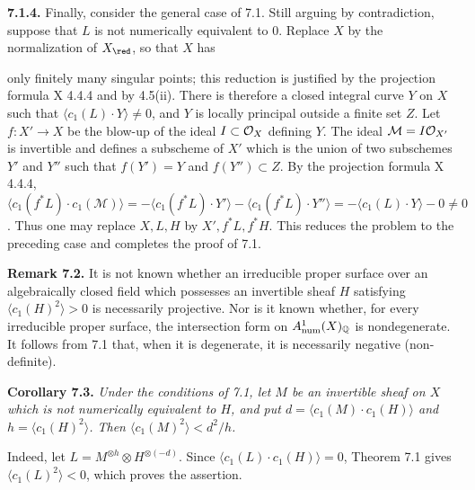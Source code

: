 \textbf{7.1.4.} Finally, consider the general case of 7.1. Still arguing by contradiction, suppose that $L$ is not numerically equivalent to $0$. Replace $X$ by the normalization of $X_{\red}$, so that $X$ has

only finitely many singular points; this reduction is justified by the projection formula X 4.4.4 and by 4.5(ii). There is therefore a closed integral curve $Y$ on $X$ such that
$\langle c_1(L)\cdot Y\rangle\ne0$, and $Y$ is locally principal
outside a finite set $Z$. Let $f:X'\to X$ be the blow-up of the ideal
$I\subset\mathcal O_X$ defining $Y$. The ideal $\mathcal M=I\mathcal O_{X'}$ is
invertible and defines a subscheme of $X'$ which is the union of two
subschemes $Y'$ and $Y''$ such that $f(Y')=Y$ and $f(Y'')\subset Z$.
By the projection formula X 4.4.4,
$\langle c_1(f^*L)\cdot c_1(\mathcal M)\rangle
=-\langle c_1(f^*L)\cdot Y'\rangle
-\langle c_1(f^*L)\cdot Y''\rangle
=-\langle c_1(L)\cdot Y\rangle-0\ne0$. Thus one may replace $X,L,H$
by $X',f^*L,f^*H$. This reduces the problem to the preceding case and
completes the proof of 7.1.

\textbf{Remark 7.2.} It is not known whether an irreducible proper surface over an algebraically closed field which possesses an invertible sheaf $H$ satisfying $\langle c_1(H)^2\rangle>0$ is necessarily projective. Nor is it known whether, for every irreducible proper surface, the intersection form on $A^1_{\mathrm{num}}(X)_{\mathbb Q}$ is nondegenerate. It follows from 7.1 that, when it is degenerate, it is necessarily negative (non-definite).

\textbf{Corollary 7.3.} \emph{Under the conditions of 7.1, let $M$ be
an invertible sheaf on $X$ which is not numerically equivalent to $H$,
and put $d=\langle c_1(M)\cdot c_1(H)\rangle$ and
$h=\langle c_1(H)^2\rangle$. Then
$\langle c_1(M)^2\rangle<d^2/h$.}

Indeed, let $L=M^{\otimes h}\otimes H^{\otimes(-d)}$. Since
$\langle c_1(L)\cdot c_1(H)\rangle=0$, Theorem 7.1 gives
$\langle c_1(L)^2\rangle<0$, which proves the assertion.

